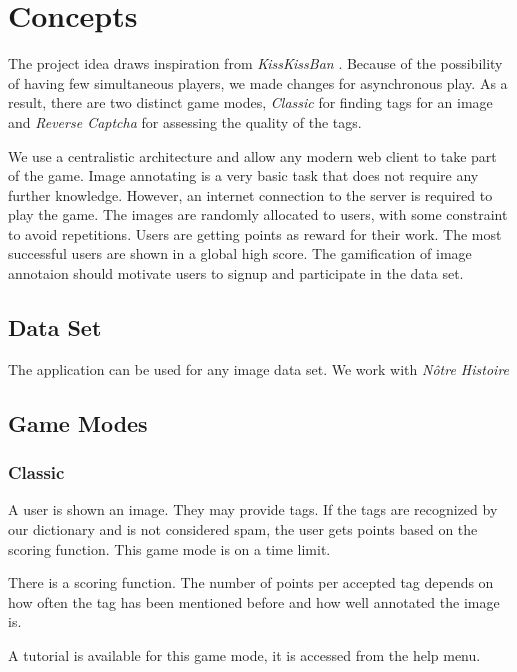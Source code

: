 \section{Concepts}
\label{gXLII:sec:concepts} %

The project idea draws inspiration from \textit{KissKissBan} \cite{10.1145/1600150.1600153}.
Because of the possibility of having few simultaneous players, we made changes for asynchronous play. As a result, there are two distinct game modes, \emph{Classic} for finding tags for an image and \emph{Reverse Captcha} for assessing the quality of the tags.

We use a centralistic architecture and allow any modern web client to take part of the game. Image annotating is a very basic task that does not require any further knowledge. However, an internet connection to the server is required to play the game. The images are randomly allocated to users, with some constraint to avoid repetitions.
Users are getting points as reward for their work. The most successful users are shown in a global high score. The gamification of image annotaion should motivate users to signup and participate in the data set.


\subsection{Data Set}
The application can be used for any image data set. We work with \textit{Nôtre Histoire}

\subsection{Game Modes}

\subsubsection{Classic}

A user is shown an image. They may provide tags. If the tags are recognized by our dictionary and is not considered spam, the user gets points based on the scoring function.
This game mode is on a time limit.

There is a scoring function. The number of points per accepted tag depends on how often the tag has been mentioned before and how well annotated the image is.

A tutorial is available for this game mode, it is accessed from the help menu.

